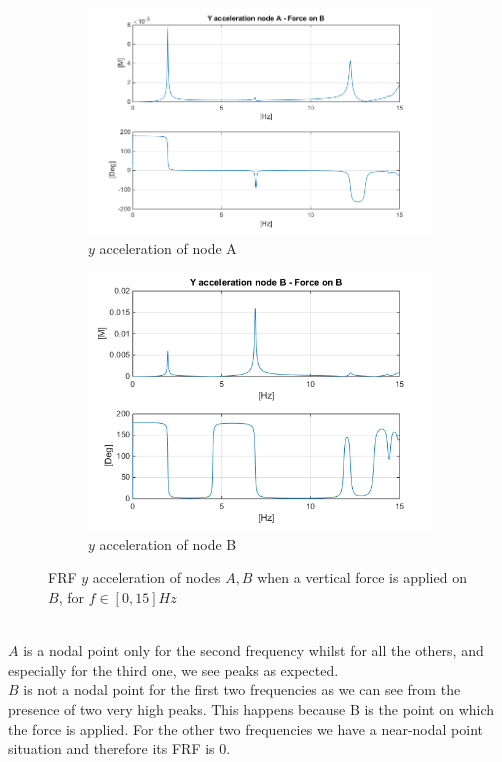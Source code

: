 \documentclass[10pt,a4paper,final]{report}
\begin{document}
\begin{figure}[h]
        \centering
        \begin{subfigure}[t]{0.5\textwidth}
                \includegraphics[width=\textwidth]{bode3}
                \caption{$y$ acceleration of node A}
                \label{fig:bode2}
        \end{subfigure}%
        \begin{subfigure}[t]{0.5\textwidth}
                \includegraphics[width=\textwidth]{bode4}
                \caption{$y$ acceleration of node B}
                \label{fig:bode2}
        \end{subfigure}
        \caption{FRF $y$ acceleration of nodes $A,B$ when a vertical force is applied on $B$, for $f \in [0,15]Hz$} \label{fig:bodes2}
\end{figure}
\\
$A$ is a nodal point only for the second frequency whilst for all the others, and especially for the third one, we see peaks as expected. \\ 
$B$ is not a nodal point for the first two frequencies as we can see from the presence of two very high peaks. This happens because B is the point on which the force is applied. For the other two frequencies we have a near-nodal point situation and therefore its FRF is 0.
\end{document}
